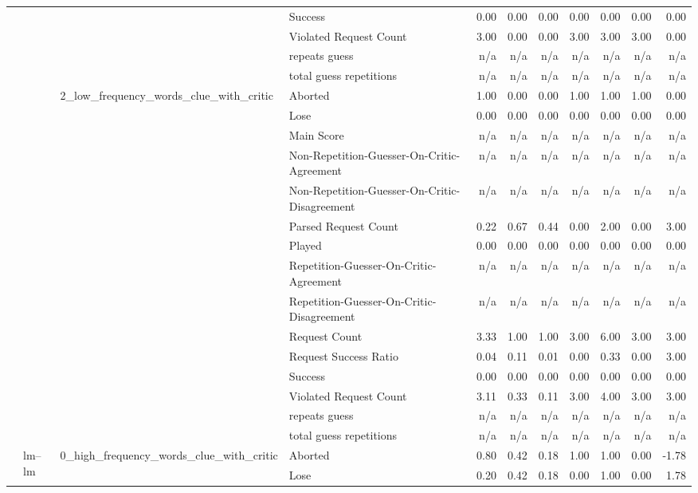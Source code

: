 \begin{tabular}{llllrrrrrrr}
 &  &  & Success & 0.00 & 0.00 & 0.00 & 0.00 & 0.00 & 0.00 & 0.00 \\
 &  &  & Violated Request Count & 3.00 & 0.00 & 0.00 & 3.00 & 3.00 & 3.00 & 0.00 \\
 &  &  & repeats guess & n/a & n/a & n/a & n/a & n/a & n/a & n/a \\
 &  &  & total guess repetitions & n/a & n/a & n/a & n/a & n/a & n/a & n/a \\
\cline{3-11}
 &  & \multirow[t]{15}{*}{2_low_frequency_words_clue_with_critic} & Aborted & 1.00 & 0.00 & 0.00 & 1.00 & 1.00 & 1.00 & 0.00 \\
 &  &  & Lose & 0.00 & 0.00 & 0.00 & 0.00 & 0.00 & 0.00 & 0.00 \\
 &  &  & Main Score & n/a & n/a & n/a & n/a & n/a & n/a & n/a \\
 &  &  & Non-Repetition-Guesser-On-Critic-Agreement & n/a & n/a & n/a & n/a & n/a & n/a & n/a \\
 &  &  & Non-Repetition-Guesser-On-Critic-Disagreement & n/a & n/a & n/a & n/a & n/a & n/a & n/a \\
 &  &  & Parsed Request Count & 0.22 & 0.67 & 0.44 & 0.00 & 2.00 & 0.00 & 3.00 \\
 &  &  & Played & 0.00 & 0.00 & 0.00 & 0.00 & 0.00 & 0.00 & 0.00 \\
 &  &  & Repetition-Guesser-On-Critic-Agreement & n/a & n/a & n/a & n/a & n/a & n/a & n/a \\
 &  &  & Repetition-Guesser-On-Critic-Disagreement & n/a & n/a & n/a & n/a & n/a & n/a & n/a \\
 &  &  & Request Count & 3.33 & 1.00 & 1.00 & 3.00 & 6.00 & 3.00 & 3.00 \\
 &  &  & Request Success Ratio & 0.04 & 0.11 & 0.01 & 0.00 & 0.33 & 0.00 & 3.00 \\
 &  &  & Success & 0.00 & 0.00 & 0.00 & 0.00 & 0.00 & 0.00 & 0.00 \\
 &  &  & Violated Request Count & 3.11 & 0.33 & 0.11 & 3.00 & 4.00 & 3.00 & 3.00 \\
 &  &  & repeats guess & n/a & n/a & n/a & n/a & n/a & n/a & n/a \\
 &  &  & total guess repetitions & n/a & n/a & n/a & n/a & n/a & n/a & n/a \\
\cline{2-11} \cline{3-11}
 & \multirow[t]{45}{*}{lm--lm} & \multirow[t]{15}{*}{0_high_frequency_words_clue_with_critic} & Aborted & 0.80 & 0.42 & 0.18 & 1.00 & 1.00 & 0.00 & -1.78 \\
 &  &  & Lose & 0.20 & 0.42 & 0.18 & 0.00 & 1.00 & 0.00 & 1.78 \\

\end{tabular}
